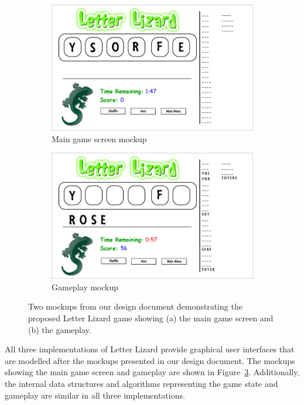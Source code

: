 \begin{figure}
    \centering
    \begin{subfigure}{0.49\textwidth}
        \includegraphics[width=\textwidth]{../mockups/Game_Screen.jpg}
        \caption{Main game screen mockup}
        \label{mainscreenmockup}
    \end{subfigure}
    \begin{subfigure}{0.49\textwidth}
        \includegraphics[width=\textwidth]{../mockups/Gameplay.jpg}
        \caption{Gameplay mockup}
        \label{gameplaymockup}
    \end{subfigure}
    \caption[Two mockups from our design document demonstrating the proposed Letter Lizard game]
    {Two mockups from our design document demonstrating the proposed Letter Lizard game
    showing (a) the main game screen and (b) the gameplay.}
    \label{mockups}
\end{figure}

All three implementations of Letter Lizard provide graphical user interfaces
that are modelled after the mockups presented in our design document. The mockups showing the
main game screen and gameplay are shown in Figure~\ref{mockups}. Additionally, the internal 
data structures and algorithms representing the game state and gameplay are similar 
in all three implementations.


